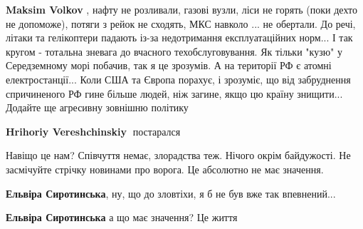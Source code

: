 \begin{itemize}
\begin{itemize}
\begin{itemize}
\textbf{Maksim Volkov} , нафту не розливали, газові вузли, ліси не горять (поки
дехто не допоможе), потяги з рейок не сходять, МКС навколо ... не обертали. До
речі, літаки та гелікоптери падають із-за недотримання експлуатаційних норм...
І так кругом - тотальна зневага до вчасного техобслуговування. Як тільки "кузю"
у Середземному морі побачив, так я це зрозумів. А на території РФ є атомні
електростанції... Коли США та Європа порахує, і зрозуміє, що від забруднення
спричиненого РФ гине більше людей, ніж загине, якщо цю країну знищити...
Додайте ще агресивну зовнішню політику

 
\textbf{Hrihoriy Vereshchinskiy} 🤣постарался
\end{itemize}

\end{itemize}

 

Навіщо це нам? Співчуття немає, злорадства теж. Нічого окрім байдужості. Не
засмічуйте стрічку новинами про ворога. Це абсолютно не має значення.

\begin{itemize}
 
\textbf{Ельвіра Сиротинська}, ну, що до зловтіхи, я б не був вже так впевнений...

 
\textbf{Ельвіра Сиротинська} а що має значення? Це життя

\begin{itemize}
 

\end{itemize}
\end{itemize}
\end{itemize}
